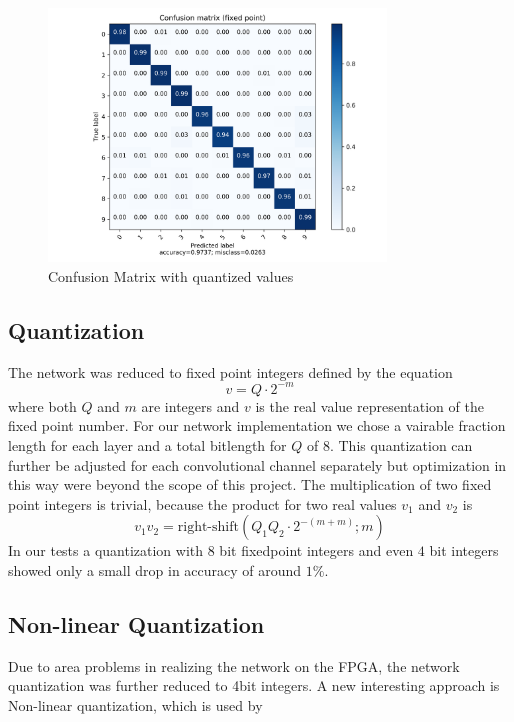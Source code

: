 \begin{figure}[htbp]
	\centering
	\includegraphics[width=0.8\textwidth]{../../net/images/qcm}
	\caption{Confusion Matrix with quantized values}
	\label{fig:network-test-qcm}
\end{figure}

\subsection{Quantization}

The network was reduced to fixed point integers defined by the equation
\begin{equation}
	v = Q \cdot 2 ^{-m}
\end{equation}
where both $Q$ and $m$ are integers and $v$ is the real value representation of the fixed point number. 
For our network implementation we chose a vairable fraction length for each layer and a total bitlength for $Q$ of $8$. 
This quantization can further be adjusted for each convolutional channel separately but optimization in this way were beyond the scope of this project.
The multiplication of two fixed point integers is trivial, because the product for two real values $v_1$ and $v_2$ is 
\begin{equation}
	v_1 v_2 = \text{right-shift}\left( Q_1 Q_2 \cdot 2^{-(m+m)} ; m\right)
\end{equation}
In our tests a quantization with $8$ bit fixedpoint integers and even $4$ bit integers showed only a small drop in accuracy of around $1 \%$.


\subsection{Non-linear Quantization}

Due to area problems in realizing the network on the FPGA, the network quantization was further reduced to 4bit integers.
A new interesting approach is Non-linear quantization, which is used by  \cite{lee2017lognet}


